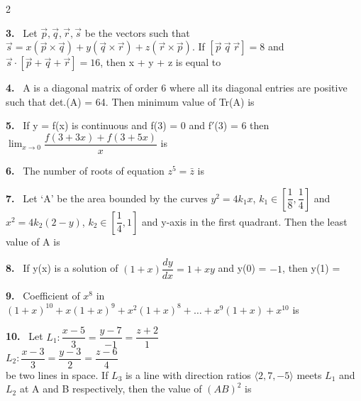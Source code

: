 \documentclass[10pt]{extarticle}
\newcommand{\qn}[1]{\par\smallskip\noindent\textbf{#1.}~}
\begin{document}
\begin{multicols}{2}
\qn{3} Let $\vec p,\vec q,\vec r,\vec s$ be the vectors such that $\vec s=x(\vec p\times\vec q)+y(\vec q\times\vec r)+z(\vec r\times\vec p)$. If $[\vec p\ \vec q\ \vec r]=8$ and $\vec s\cdot\left[\vec p+\vec q+\vec r\right]=16$, then x + y + z is equal to

\qn{4} A is a diagonal matrix of order 6 where all its diagonal entries are positive such that det.(A) = 64. Then minimum value of Tr(A) is

\qn{5} If y = f(x) is continuous and f(3) = 0 and f$'$(3) = 6 then $\displaystyle\lim_{x\to0}\dfrac{f(3+3x)+f(3+5x)}x$ is

\qn{6} The number of roots of equation $z^5=\bar z$ is

\qn{7} Let `A' be the area bounded by the curves $y^2=4k_1x$, $k_1\in\left[\dfrac18,\dfrac14\right]$ and $x^2=4k_2(2-y)$, $k_2\in\left[\dfrac14,1\right]$ and y-axis in the first quadrant. Then the least value of A is

\qn{8} If y(x) is a solution of $(1+x)\dfrac{dy}{dx}=1+xy$ and y(0) = $-1$, then y(1) =

\qn{9} Coefficient of $x^8$ in $(1+x)^{10}+x(1+x)^9+x^2(1+x)^8+\dots+x^9(1+x)+x^{10}$ is

\qn{10} Let $L_1:\dfrac{x-5}3=\dfrac{y-7}{-1}=\dfrac{z+2}1$\\
$L_2:\dfrac{x-3}3=\dfrac{y-3}2=\dfrac{z-6}4$\\
be two lines in space. If $L_3$ is a line with direction ratios $\langle2,7,-5\rangle$ meets $L_1$ and $L_2$ at A and B respectively, then the value of $(AB)^2$ is

\end{multicols}
\end{document}
